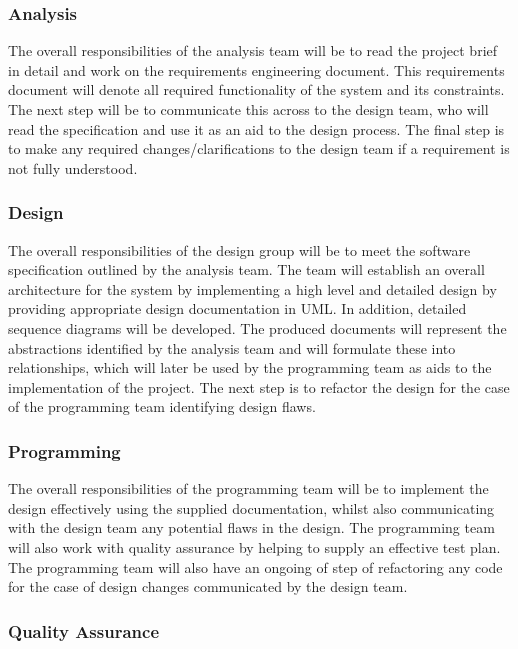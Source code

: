 \documentclass[11pt]{article}
\begin{document}
\subsubsection{Analysis}

The overall responsibilities of the analysis team will be to read the project brief in detail and work on the requirements engineering document. This requirements document will denote all required functionality of the system and its constraints. The next step will be to communicate this across to the design team, who will read the specification and use it as an aid to the design process. The final step is to make any required changes/clarifications to the design team if a requirement is not fully understood.

\subsubsection{Design}

The overall responsibilities of the design group will be to meet the software specification outlined by the analysis team. The team will establish an overall architecture for the system by implementing a high level and detailed design by providing appropriate design documentation in UML. In addition, detailed sequence diagrams will be developed. The produced documents will represent the abstractions identified by the analysis team and will formulate these into relationships, which will later be used by the programming team as aids to the implementation of the project. The next step is to refactor the design for the case of the programming team identifying design flaws.

\subsubsection{Programming}

The overall responsibilities of the programming team will be to implement the design effectively using the supplied documentation, whilst also communicating with the design team any potential flaws in the design. The programming team will also work with quality assurance by helping to supply an effective test plan. The programming team will also have an ongoing of step of refactoring any code for the case of design changes communicated by the design team.

\subsubsection{Quality Assurance}
\end{document}
